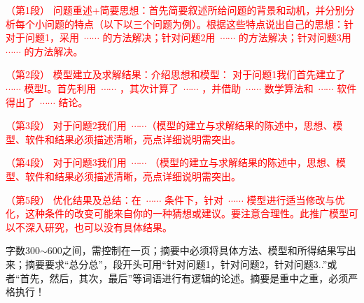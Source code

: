 

{\song\xiaosihao
\setlength{\parindent}{2em}\textcolor{red}{（第1段）	问题重述+简要思想：首先简要叙述所给问题的背景和动机，并分别分析每个小问题的特点（以下以三个问题为例）。根据这些特点说出自己的思想：针对于问题1，采用~$\cdots \cdots$ 的方法解决；针对问题2用~$\cdots \cdots$ 的方法解决；针对问题3用~$\cdots \cdots$ 的方法解决。}


\setlength{\parindent}{2em}\textcolor{red}{（第2段）	模型建立及求解结果：介绍思想和模型： 对于问题1我们首先建立了~$\cdots \cdots$ 模型I。首先利用~$\cdots \cdots$ ，其次计算了~$\cdots \cdots$ ，并借助~$\cdots \cdots$ 数学算法和~$\cdots \cdots$ 软件得出了~$\cdots \cdots$ 结论。}

\setlength{\parindent}{2em} \textcolor{red}{（第3段）	对于问题2我们用~$\cdots \cdots$（模型的建立与求解结果的陈述中，思想、模型、软件和结果必须描述清晰，亮点详细说明需突出。}

\setlength{\parindent}{2em}\textcolor{red}{（第4段）	对于问题3我们用~$\cdots \cdots$ （模型的建立与求解结果的陈述中，思想、模型、软件和结果必须描述清晰，亮点详细说明需突出。}

\setlength{\parindent}{2em}\textcolor{red}{（第5段）	优化结果及总结：在~$\cdots \cdots$ 条件下，针对~$\cdots \cdots$ 模型进行适当修改与优化，这种条件的改变可能来自你的一种猜想或建议。要注意合理性。此推广模型可以不深入研究，也可以没有具体结果。}
}

\begin{rmk}
    字数300$\sim $600之间，需控制在一页；摘要中必须将具体方法、模型和所得结果写出来；摘要要求“总分总”，段开头可用“针对问题1，针对问题2，针对问题3..”或者“首先，然后，其次，最后”等词语进行有逻辑的论述。摘要是重中之重，必须严格执行！
\end{rmk}





